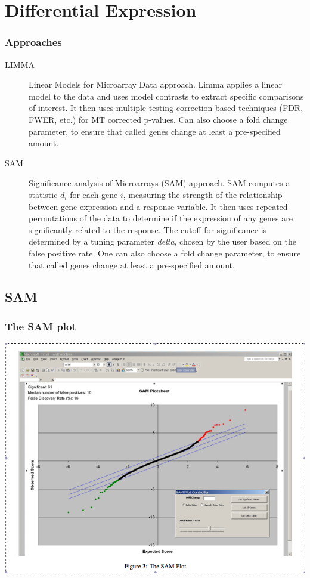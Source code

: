 \documentclass[pdf]{beamer}
\begin{document}
\section{Differential Expression}
\begin{frame}
  \frametitle{Approaches}
  \begin{description}
  \item [LIMMA] Linear Models for Microarray Data approach. Limma applies a linear model to the data and uses model contrasts to extract specific comparisons of interest. It then uses multiple testing correction based techniques (FDR, FWER, etc.) for MT corrected p-values. Can also choose a fold change parameter, to ensure that called genes change at least a pre-specified amount. 
  \item [SAM] Significance analysis of Microarrays (SAM) approach. SAM computes a statistic $d_i$ for each gene $i$, measuring the strength of the relationship between gene expression and a response variable. It then uses repeated permutations of the data to determine if the expression of any genes are significantly related to the response. The cutoff for significance is determined by a tuning parameter \textit{delta}, chosen by the user based on the false positive rate. One can also choose a fold change parameter, to ensure that called genes change at least a pre-specified amount.
  \end{description}
\end{frame}

\subsection{SAM}
\begin{frame}
  \frametitle{The SAM plot}
  \begin{center}
  \centering \includegraphics[scale=0.35]{figures/samplot.png}
  \end{center}
\end{frame}
\end{document}

